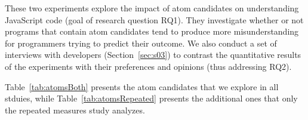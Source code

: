 These two experiments explore the impact of atom candidates on understanding JavaScript code (goal of research question RQ1). They investigate whether or not programs that contain atom candidates tend to produce more misunderstanding for programmers trying to predict their outcome.%
We also conduct a set of interviews with developers (Section~\ref{sec:s03}) to contrast the quantitative results of the experiments with their preferences and opinions (thus addressing RQ2). %

Table~\ref{tab:atomsBoth} presents the atom candidates that we explore in all stduies, while Table~\ref{tab:atomsRepeated} presents the additional 
ones that only the repeated measures study analyzes. 


